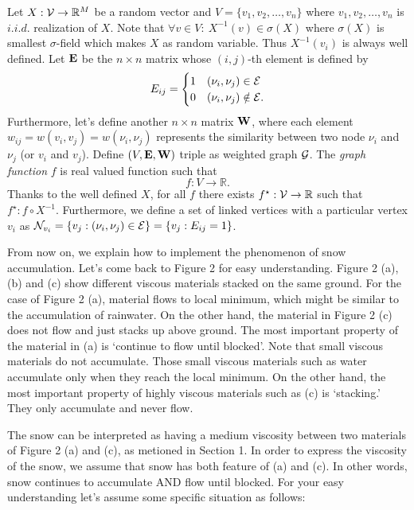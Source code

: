 \documentclass[preprint, review, 12pt]{article}
\theoremstyle{definition}
\theoremstyle{remark}
\begin{document}
Let $X:{\cal V} \to \mathbb{R}^M$ be a random vector and $V=\{v_1,v_2,\dots,v_n\}$ where $v_1,v_2,\dots,v_n$ is $i.i.d.$ realization of $X$. Note that $\forall v \in V : ~ X^{-1}(v) \in \sigma(X)$ where $\sigma(X)$ is smallest $\sigma$-field which makes $X$ as random variable. Thus $X^{-1}(v_i)$ is always well defined. Let ${\bf E}$ be the $n \times n$ matrix whose $(i,j)$-th element is defined by 
$$E_{ij}=\begin{cases} 1 & (\nu_i,\nu_j)\in {\cal E} \\ 0 & (\nu_i,\nu_j) \notin {\cal E}.\end{cases}$$ Furthermore, let's define another $n\times n$ matrix ${\bf W}$, where each element $w_{ij}=w(v_i,v_j)=w(\nu_i,\nu_j)$ represents the similarity between two node $\nu_i$ and $\nu_j$ (or $v_i$ and $v_j$). Define $(V,{\bf E},{\bf W})$ triple as weighted graph ${\cal G}$. The \emph{graph function} $f$ is real valued function such that 
\[
f : V \to \mathbb{R}.
\]
Thanks to the well defined $X$, for all $f$ there exists $f^{\star}: {\cal V} \to \mathbb{R}$ such that $f^{\star}:f\circ X^{-1}$.
Furthermore, we define a set of linked vertices with a particular vertex $v_i$ as ${\cal N}_{v_i}=\{v_j: (\nu_i,\nu_j) \in {\cal E} \}=\{v_j:E_{ij}=1\}$.

From now on, we explain how to implement the phenomenon of snow accumulation. Let's come back to Figure 2 for easy understanding. Figure 2 (a), (b) and (c) show different viscous materials stacked on the same ground. For the case of Figure 2 (a), material flows to local minimum, which might be similar to the accumulation of rainwater. On the other hand, the material in Figure 2 (c) does not flow and just stacks up above ground. The most important property of the material in (a) is `continue to flow until blocked'. Note that small viscous materials do not accumulate. Those small viscous materials such as water accumulate only when they reach the local minimum. On the other hand, the most important property of highly viscous materials such as (c) is `stacking.' They only accumulate and never flow. 

The snow can be interpreted as having a medium viscosity between two materials of Figure 2 (a) and (c), as metioned in Section 1. In order to express the viscosity of the snow, we assume that snow has both feature of (a) and (c). In other words, snow continues to accumulate AND flow until blocked. 
For your easy understanding let's assume some specific situation as follows: 
\end{document}
